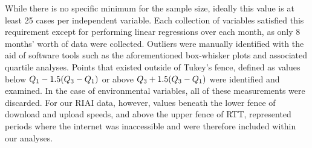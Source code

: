 While there is no specific minimum for the sample size, ideally this value is at least 25 cases per independent variable. Each collection of variables satisfied this requirement except for performing linear regressions over each month, as only 8 months’ worth of data were collected. Outliers were manually identified with the aid of software tools such as the aforementioned box-whisker plots and associated quartile analyses. Points that existed outside of Tukey’s fence, defined as values below $Q\textsubscript{1}-1.5(Q\textsubscript{3}-Q\textsubscript{1})$ or above $Q\textsubscript{3}+1.5(Q\textsubscript{3}-Q\textsubscript{1})$ were identified and examined. In the case of environmental variables, all of these measurements were discarded. For our RIAI data, however, values beneath the lower fence of download and upload speeds, and above the upper fence of RTT, represented periods where the internet was inaccessible and were therefore included within our analyses. 
